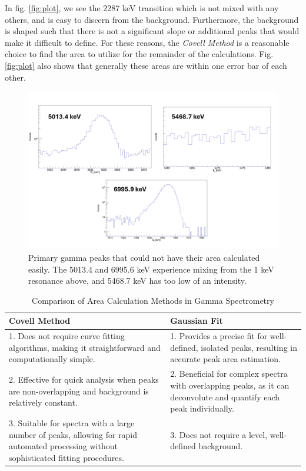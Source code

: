 \documentclass[a4paper,12pt]{article}
\begin{document}
In fig. \ref{fig:plot}, we see the 2287 keV transition which is not mixed with any others, and is easy to discern from the background.  Furthermore, the background is shaped such that there is not a significant slope or additional peaks that would make it difficult to define.  For these reasons, the \textit{Covell Method} is a reasonable choice to find the area to utilize for the remainder of the calculations. Fig. \ref{fig:plot} also shows that generally these areas are within one error bar of each other.





\begin{figure}[H]
    \centering
    \hspace{-1.5}
    \includegraphics[width=16cm]{other_pg.png}
    \caption{Primary gamma peaks that could not have their area calculated easily. The 5013.4 and 6995.6 keV experience mixing from the 1 keV resonance above, and 5468.7 keV has too low of an intensity.}
    \label{fig:other_pg}
\end{figure}

\begin{table}[h]
\centering
\label{table:area_calc_comparison}
\begin{tabular}{||p{}|p{}||}
\hline
\textbf{Covell Method} & \textbf{Gaussian Fit} \\
\hline
1. Does not require curve fitting algorithms, making it straightforward and computationally simple. & 1. Provides a precise fit for well-defined, isolated peaks, resulting in accurate peak area estimation. \\
\hline
2. Effective for quick analysis when peaks are non-overlapping and background is relatively constant. & 2. Beneficial for complex spectra with overlapping peaks, as it can deconvolute and quantify each peak individually. \\
\hline
3. Suitable for spectra with a large number of peaks, allowing for rapid automated processing without sophisticated fitting procedures. & 3. Does not require a level, well-defined background. \\
\hline
\end{tabular}
\caption{Comparison of Area Calculation Methods in Gamma Spectrometry}
\end{table}
\end{document}
